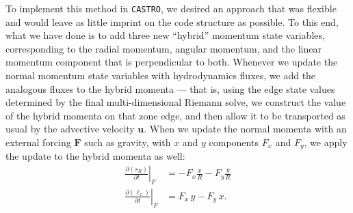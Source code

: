 \documentclass[twocolumn,numberedappendix]{../aastex6}
\newcommand{\castro}{\texttt{CASTRO}}
\begin{document}
To implement this method in \castro, we desired an approach that was flexible
and would leave as little imprint on the code structure as possible.
To this end, what we have done is to add three new ``hybrid'' momentum state
variables, corresponding to the radial momentum, angular momentum, and the linear
momentum component that is perpendicular to both. Whenever we update the normal
momentum state variables with hydrodynamics fluxes, we add the analogous fluxes
to the hybrid momenta --- that is, using the edge state values determined by the
final multi-dimensional Riemann solve, we construct the value of the hybrid
momenta on that zone edge, and then allow it to be transported as usual by the
advective velocity $\mathbf{u}$. When we update the normal momenta with an
external forcing $\mathbf{F}$ such as gravity, with $x$ and $y$
components $F_x$ and $F_y$, we apply the update to the hybrid momenta as well:
\begin{align}
  \left.\frac{\partial(s_R)}{\partial t}\right|_{F} &= -F_x \frac{x}{R} - F_y\frac{y}{R} \label{eq:force-radial}\\
  \left.\frac{\partial(\ell_z)}{\partial t}\right|_{F} &= F_x\, y - F_y\, x.\label{eq:force-angular}
  \end{align}
\end{document}

